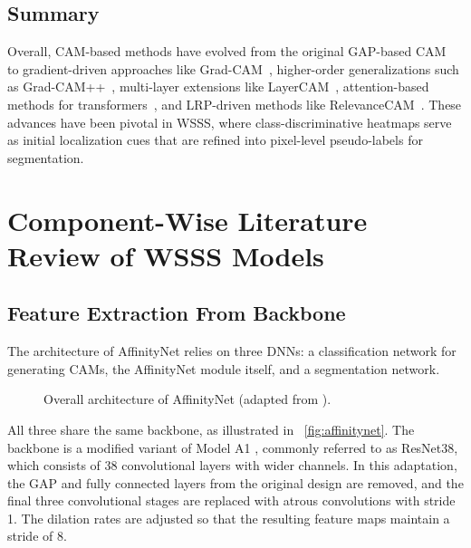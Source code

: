 \subsection{Summary}
Overall, CAM-based methods have evolved from the original GAP-based CAM~\cite{cam} to gradient-driven approaches like Grad-CAM~\cite{cam_grad}, higher-order generalizations such as Grad-CAM++~\cite{cam_gradpp}, multi-layer extensions like LayerCAM~\cite{layer_cam}, attention-based methods for transformers~\cite{attention_rollout}, and LRP-driven methods like RelevanceCAM~\cite{relevance_cam}. These advances have been pivotal in WSSS, where class-discriminative heatmaps serve as initial localization cues that are refined into pixel-level pseudo-labels for segmentation.

\section{Component-Wise Literature Review of WSSS Models}
\label{sec:how-wsss-models-work}

\subsection{Feature Extraction From Backbone}
\label{subsec:feature-extraction-backbone}

The architecture of AffinityNet \cite{wsss_affinitynet} relies on three DNNs: a classification network for generating CAMs, the AffinityNet module itself, and a segmentation network. 
\begin{figure}[htbp]
    \centering
    \caption{Overall architecture of AffinityNet (adapted from \cite{wsss_affinitynet}).}
    \label{fig:affinitynet}
\end{figure}

All three share the same backbone, as illustrated in ~\autoref{fig:affinitynet}. The backbone is a modified variant of Model A1 \cite{RevisitingResNET}, commonly referred to as ResNet38, which consists of 38 convolutional layers with wider channels. In this adaptation, the GAP and fully connected layers from the original design are removed, and the final three convolutional stages are replaced with atrous convolutions with stride 1. The dilation rates are adjusted so that the resulting feature maps maintain a stride of 8.

